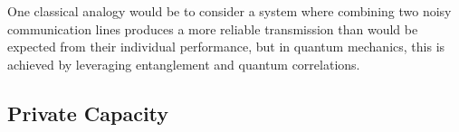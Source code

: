         

One classical analogy would be to consider a system where combining two noisy communication
lines produces a more reliable transmission than would be expected from their individual
performance, but in quantum mechanics, this is achieved by leveraging entanglement and quantum
correlations.

\subsection{Private Capacity}